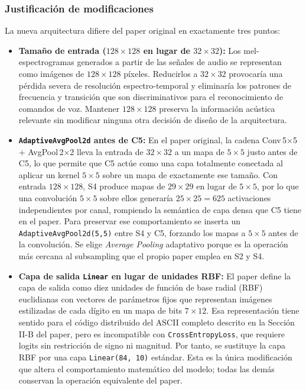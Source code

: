 \documentclass[conference]{IEEEtran}
\begin{document}
\subsubsection{Justificación de modificaciones}
La nueva arquitectura difiere del paper original en exactamente tres puntos:

\begin{itemize}
    \item \textbf{Tamaño de entrada ($128 \times 128$ en lugar de $32 \times 32$):}
    Los mel-espectrogramas generados a partir de las señales de audio se representan
    como imágenes de $128 \times 128$ píxeles. Reducirlos a $32 \times 32$ provocaría
    una pérdida severa de resolución espectro-temporal y eliminaría los patrones de
    frecuencia y transición que son discriminativos para el reconocimiento de comandos
    de voz. Mantener $128 \times 128$ preserva la información acústica relevante sin
    modificar ninguna otra decisión de diseño de la arquitectura.

    \item \textbf{\texttt{AdaptiveAvgPool2d} antes de C5:}
    En el paper original, la cadena Conv\,5$\times$5 + AvgPool\,2$\times$2 lleva
    la entrada de $32 \times 32$ a un mapa de $5 \times 5$ justo antes de C5, lo que
    permite que C5 actúe como una capa totalmente conectada al aplicar un kernel
    $5 \times 5$ sobre un mapa de exactamente ese tamaño. Con entrada $128 \times 128$,
    S4 produce mapas de $29 \times 29$ en lugar de $5 \times 5$, por lo que una
    convolución $5 \times 5$ sobre ellos generaría $25 \times 25 = 625$ activaciones
    independientes por canal, rompiendo la semántica de capa densa que C5 tiene en el
    paper. Para preservar ese comportamiento se inserta un \texttt{AdaptiveAvgPool2d(5,5)}
    entre S4 y C5, forzando los mapas a $5 \times 5$ antes de la convolución. Se elige
    \textit{Average Pooling} adaptativo porque es la operación más cercana al
    subsampling que el propio paper emplea en S2 y S4.

    \item \textbf{Capa de salida \texttt{Linear} en lugar de unidades RBF:}
    El paper define la capa de salida como diez unidades de función de base radial
    (RBF) euclidianas con vectores de parámetros fijos que representan imágenes
    estilizadas de cada dígito en un mapa de bits $7 \times 12$. Esa representación
    tiene sentido para el código distribuido del ASCII completo descrito en la Sección
    II-B del paper, pero es incompatible con \texttt{CrossEntropyLoss}, que requiere
    logits sin restricción de signo ni magnitud. Por tanto, se sustituye la capa RBF
    por una capa \texttt{Linear(84, 10)} estándar. Esta es la única modificación
    que altera el comportamiento matemático del modelo; todas las demás conservan
    la operación equivalente del paper.
\end{itemize}
\end{document}
